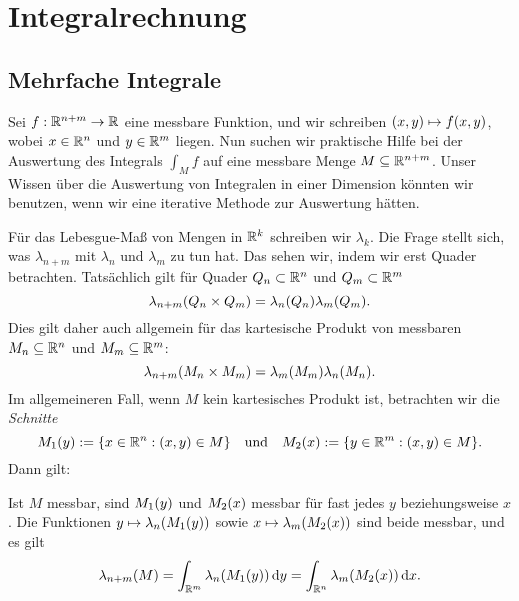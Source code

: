 \section{Integralrechnung}


\subsection{Mehrfache Integrale}

Sei \(f: \mathbb{R}^{n + m} \to \mathbb{R}\) eine messbare Funktion, und wir schreiben \(\parentheses*{x, y} \mapsto f\parentheses*{x, y}\), wobei \(x \in \mathbb{R}^n\) und \(y \in \mathbb{R}^m\) liegen.
Nun suchen wir praktische Hilfe bei der Auswertung des Integrals \(\int_M f\) auf eine messbare Menge \(M \subseteq \mathbb{R}^{n + m}\).
Unser Wissen über die Auswertung von Integralen in einer Dimension könnten wir benutzen, wenn wir eine iterative Methode zur Auswertung hätten.

Für das Lebesgue-Maß von Mengen in \(\mathbb{R}^k\) schreiben wir \(\lambda_k\).
Die Frage stellt sich, was \(\lambda_{n + m}\) mit \(\lambda_n\) und \(\lambda_m\) zu tun hat.
Das sehen wir, indem wir erst Quader betrachten.
Tatsächlich gilt für Quader \(Q_n \subset \mathbb{R}^n\) und \(Q_m \subset \mathbb{R}^m\)
\begin{equation}
	\lambda_{n + m}\parentheses*{Q_n \times Q_m} = \lambda_n\parentheses*{Q_n}\lambda_m\parentheses*{Q_m}.
\end{equation}
Dies gilt daher auch allgemein für das kartesische Produkt von messbaren \(M_n \subseteq \mathbb{R}^n\) und \(M_m \subseteq \mathbb{R}^m\):
\[
	\lambda_{n + m}\parentheses*{M_n \times M_m} = \lambda_m\parentheses*{M_m}\lambda_n\parentheses*{M_n}.
\]
Im allgemeineren Fall, wenn \(M\) kein kartesisches Produkt ist, betrachten wir die \emph{Schnitte}
\begin{equation}
	M_1\parentheses*{y} := \braces*{x \in \R^n : \parentheses*{x, y} \in M} \quad \text{und} \quad M_2\parentheses*{x} := \braces*{y \in \R^m : \parentheses*{x, y} \in M}.
\end{equation}
Dann gilt:

\begin{proposition}
	Ist \(M\) messbar, sind \(M_1\parentheses*{y}\) und \(M_2\parentheses*{x}\) messbar für fast jedes \(y\) beziehungsweise \(x\).
	Die Funktionen \(y \mapsto \lambda_n\parentheses*{M_1\parentheses*{y}}\) sowie \(x \mapsto \lambda_m\parentheses*{M_2\parentheses*{x}}\) sind beide messbar, und es gilt
	\begin{equation}\label{equation:44}
		\lambda_{n + m}\parentheses*{M} = \int_{\R^m}\lambda_n\parentheses*{M_1\parentheses*{y}}\d y = \int_{\R^n}\lambda_m\parentheses*{M_2\parentheses*{x}}\d x.
	\end{equation}
\end{proposition}

